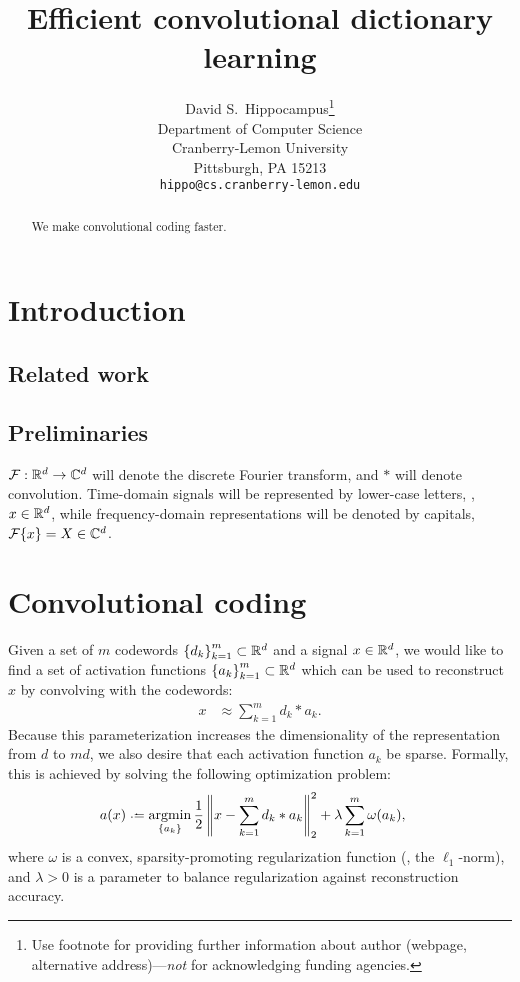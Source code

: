 \documentclass{article} %
\title{Efficient convolutional dictionary learning}
\author{
David S.~Hippocampus\thanks{ Use footnote for providing further information
about author (webpage, alternative address)---\emph{not} for acknowledging
funding agencies.} \\
Department of Computer Science\\
Cranberry-Lemon University\\
Pittsburgh, PA 15213 \\
\texttt{hippo@cs.cranberry-lemon.edu}
}
\begin{document}
\maketitle

\begin{abstract}
We make convolutional coding faster.
\end{abstract}

\section{Introduction}
\cite{mairal2010}

\subsection{Related work}

\subsection{Preliminaries}
$\mathcal{F}:\mathbb{R}^d\rightarrow\mathbb{C}^d$ will denote the discrete Fourier transform, and $*$ will denote
convolution.
Time-domain signals will be represented by lower-case letters, \eg, $x \in \mathbb{R}^d$, while
frequency-domain representations will be denoted by capitals, $\mathcal{F}\{x\} = X \in \mathbb{C}^d$.

\section{Convolutional coding}
\label{sec:convcode}
Given a set of $m$ codewords ${\{d_k\}}_{k=1}^m \subset \mathbb{R}^d$ and a signal $x\in\mathbb{R}^d$, 
we would like to find a set of activation functions ${\{a_k\}}_{k=1}^m\subset\mathbb{R}^d$ which
can be used to reconstruct $x$ by convolving with the codewords:
\begin{align}
x &\approx \sum_{k=1}^m d_k * a_k.\label{eq:convapprox}
\end{align}
Because this parameterization increases the dimensionality of the representation from $d$ 
to $md$, we also desire that each activation function $a_k$ be sparse.  Formally, this is 
achieved by solving the following optimization problem:
\begin{align}
a(x) &\defeq \argmin_{\{a_k\}} \frac{1}{2} \left\|x - \sum_{k=1}^m d_k * a_k\right\|_2^2 +
\lambda \sum_{k=1}^m \omega(a_k), \label{eq:sisc}
\end{align}
where $\omega$ is a convex, sparsity-promoting regularization function (\eg, the 
$\ell_1$-norm), and $\lambda > 0 $ is a parameter to balance regularization against 
reconstruction accuracy. 
\end{document}
